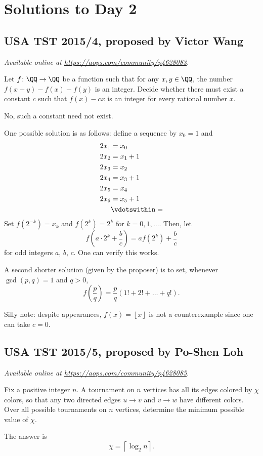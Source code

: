 \documentclass[11pt]{scrartcl}
\begin{document}
\section{Solutions to Day 2}
\subsection{USA TST 2015/4, proposed by Victor Wang}
\textsl{Available online at \url{https://aops.com/community/p4628083}.}
\begin{mdframed}[style=mdpurplebox,frametitle={Problem statement}]
Let $f \colon \QQ \to \QQ$ be a function such that for any $x,y \in \QQ$,
the number $f(x+y)-f(x)-f(y)$ is an integer.
Decide whether there must exist a constant $c$
such that $f(x) - cx$ is an integer for every rational number $x$.
\end{mdframed}
No, such a constant need not exist.

One possible solution is as follows:
define a sequence by $x_0 = 1$ and
\begin{align*}
  2x_1 &= x_0 \\
  2x_2 &= x_1 + 1 \\
  2x_3 &= x_2 \\
  2x_4 &= x_3 + 1 \\
  2x_5 &= x_4 \\
  2x_6 &= x_5 + 1 \\
  &\vdotswithin=
\end{align*}
Set $f(2^{-k}) = x_k$ and $f(2^k)=2^k$ for $k=0,1,\dots$.
Then, let
\[ f\left( a \cdot 2^k + \frac bc \right)
  = a f\left( 2^k \right) + \frac bc \]
for odd integers $a$, $b$, $c$.
One can verify this works.

A second shorter solution (given by the proposer) is to set,
whenever $\gcd(p,q) = 1$ and $q > 0$,
\[ f\left( \frac pq \right)
  = \frac pq \left( 1! + 2! + \dots + q! \right). \]


\begin{remark*}
  Silly note: despite appearances,
  $f(x) = \left\lfloor x \right\rfloor$
  is not a counterexample since one can take $c = 0$.
\end{remark*}
\pagebreak

\subsection{USA TST 2015/5, proposed by Po-Shen Loh}
\textsl{Available online at \url{https://aops.com/community/p4628085}.}
\begin{mdframed}[style=mdpurplebox,frametitle={Problem statement}]
Fix a positive integer $n$.
A tournament on $n$ vertices has all its edges colored by $\chi$ colors,
so that any two directed edges $u \to v$
and $v \to w$ have different colors.
Over all possible tournaments on $n$ vertices,
determine the minimum possible value of $\chi$.
\end{mdframed}
The answer is
\[ \chi = \left\lceil \log_2 n \right\rceil. \]
\end{document}
